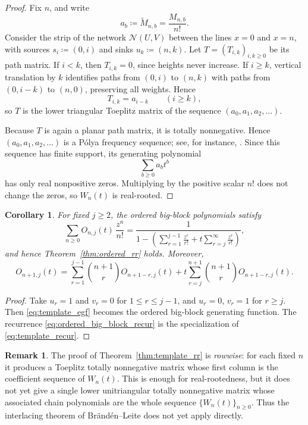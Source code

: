 \documentclass[11pt,reqno]{amsart}
\newtheorem{corollary}[theorem]{Corollary}
\theoremstyle{definition}
\newtheorem{remark}[theorem]{Remark}
\begin{document}
\begin{proof}
Fix \(n\), and write
\[
  a_b \coloneqq \widetilde M_{n,b} = \frac{M_{n,b}}{n!}.
\]
Consider the strip of the network \(\mathcal N(U,V)\) between the lines
\(x=0\) and \(x=n\), with sources \(s_i\coloneqq(0,i)\) and sinks
\(u_k\coloneqq(n,k)\). Let \(T=(T_{i,k})_{i,k\geq 0}\) be its path matrix. If
\(i<k\), then \(T_{i,k}=0\), since heights never increase. If \(i\geq k\),
vertical translation by \(k\) identifies paths from \((0,i)\) to \((n,k)\)
with paths from \((0,i-k)\) to \((n,0)\), preserving all weights. Hence
\[
  T_{i,k} = a_{i-k}
  \qquad (i\geq k),
\]
so \(T\) is the lower triangular Toeplitz matrix of the sequence
\((a_0,a_1,a_2,\dotsc)\).

Because \(T\) is again a planar path matrix, it is totally nonnegative. Hence
\((a_0,a_1,a_2,\dotsc)\) is a P\'olya frequency sequence; see, for instance,
\cite[Section~4]{BrandenLeite2024x}. Since this sequence has finite support,
its generating polynomial
\[
  \sum_{b\geq 0} a_b t^b
\]
has only real nonpositive zeros. Multiplying by the positive scalar \(n!\)
does not change the zeros, so \(W_n(t)\) is real-rooted.
\end{proof}

\begin{corollary}\label{cor:ordered_big_blocks}
For fixed \(j \geq 2\), the ordered big-block polynomials satisfy
\[
  \sum_{n \geq 0} O_{n,j}(t)\,\frac{z^n}{n!}
  =
  \frac{1}{
    1
    -
    \left(
      \sum_{r=1}^{j-1} \frac{z^r}{r!}
      +
      t \sum_{r=j}^{\infty} \frac{z^r}{r!}
    \right)
  },
\]
and hence Theorem~\ref{thm:ordered_rr} holds.
Moreover,
\begin{equation}\label{eq:ordered_big_block_recur}
  O_{n+1,j}(t)
  =
  \sum_{r=1}^{j-1} \binom{n+1}{r} O_{n+1-r,j}(t)
  + t \sum_{r=j}^{n+1} \binom{n+1}{r} O_{n+1-r,j}(t).
\end{equation}
\end{corollary}

\begin{proof}
Take \(u_r=1\) and \(v_r=0\) for \(1 \leq r \leq j-1\), and \(u_r=0\),
\(v_r=1\) for \(r\geq j\). Then \eqref{eq:template_egf} becomes the ordered
big-block generating function. The recurrence \eqref{eq:ordered_big_block_recur}
is the specialization of \eqref{eq:template_recur}.
\end{proof}

\begin{remark}\label{rem:ordered_rowwise}
The proof of Theorem~\ref{thm:template_rr} is \emph{rowwise}: for each fixed
\(n\) it produces a Toeplitz totally nonnegative matrix whose first column is
the coefficient sequence of \(W_n(t)\). This is enough for real-rootedness,
but it does not yet give a single lower unitriangular totally nonnegative
matrix whose associated chain polynomials are the whole sequence
\(\{W_n(t)\}_{n\geq 0}\). Thus the interlacing theorem of
Br\"and\'en--Leite does not yet apply directly.
\end{remark}
\end{document}
